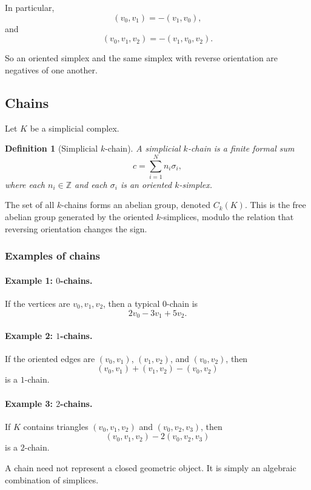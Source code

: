 \documentclass[12pt,a4paper]{article}
\newtheorem{definition}{Definition}[section]
\theoremstyle{notespace}
\begin{document}
In particular,
\[
(v_0,v_1)=-(v_1,v_0),
\]
and
\[
(v_0,v_1,v_2)=-(v_1,v_0,v_2).
\]

So an oriented simplex and the same simplex with reverse orientation are negatives of one another.

\subsection{Chains}

Let \(K\) be a simplicial complex.

\begin{definition}[Simplicial \(k\)-chain]
	A \emph{simplicial \(k\)-chain} is a finite formal sum
	\[
	c=\sum_{i=1}^{N} n_i \sigma_i,
	\]
	where each \(n_i\in \mathbb{Z}\) and each \(\sigma_i\) is an oriented \(k\)-simplex.
\end{definition}

The set of all \(k\)-chains forms an abelian group, denoted \(C_k(K)\). This is the free abelian group generated by the oriented \(k\)-simplices, modulo the relation that reversing orientation changes the sign.

\subsubsection*{Examples of chains}

\paragraph{Example 1: \(0\)-chains.}
If the vertices are \(v_0,v_1,v_2\), then a typical \(0\)-chain is
\[
2v_0-3v_1+5v_2.
\]

\paragraph{Example 2: \(1\)-chains.}
If the oriented edges are \((v_0,v_1)\), \((v_1,v_2)\), and \((v_0,v_2)\), then
\[
(v_0,v_1)+(v_1,v_2)-(v_0,v_2)
\]
is a \(1\)-chain.

\paragraph{Example 3: \(2\)-chains.}
If \(K\) contains triangles \((v_0,v_1,v_2)\) and \((v_0,v_2,v_3)\), then
\[
(v_0,v_1,v_2) - 2(v_0,v_2,v_3)
\]
is a \(2\)-chain.

A chain need not represent a closed geometric object. It is simply an algebraic combination of simplices.
\end{document}
